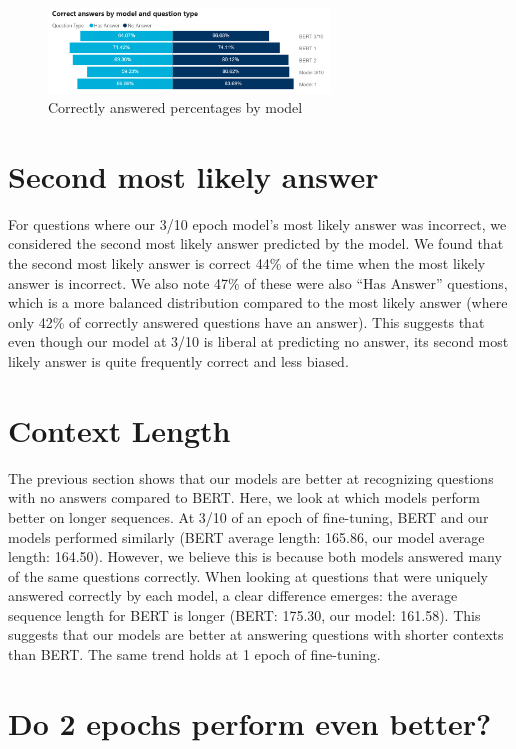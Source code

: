 \begin{figure}[ht]
	\centering
	\includegraphics[width=7.5cm]{images/QA_Correct_Answers_by_Question_Type.png}
	\caption{\label{fig:qa_correct_answers_by_model_and_type}Correctly answered percentages by model}
\end{figure}

\section{Second most likely answer}

For questions where our 3/10 epoch model’s most likely answer was incorrect, we considered the second most likely answer predicted by the model. We found that the second most likely answer is correct 44\% of the time when the most likely answer is incorrect. We also note 47\% of these were also “Has Answer” questions, which is a more balanced distribution compared to the most likely answer (where only 42\% of correctly answered questions have an answer). This suggests that even though our model at 3/10 is liberal at predicting no answer, its second most likely answer is quite frequently correct and less biased. 

\section{Context Length}

The previous section shows that our models are better at recognizing questions with no answers compared to BERT. Here, we look at which models perform better on longer sequences. At 3/10 of an epoch of fine-tuning, BERT and our models performed similarly (BERT average length: 165.86, our model average length: 164.50). However, we believe this is because both models answered many of the same questions correctly. When looking at questions that were uniquely answered correctly by each model, a clear difference emerges: the average sequence length for BERT is longer (BERT: 175.30, our model: 161.58). This suggests that our models are better at answering questions with shorter contexts than BERT. The same trend holds at 1 epoch of fine-tuning.

\section{Do 2 epochs perform even better?}

